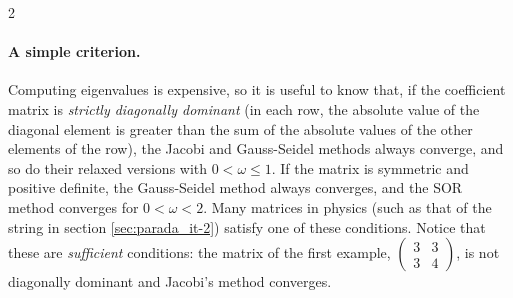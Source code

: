 \begin{paracol}{2}
\paragraph{A simple criterion.} Computing eigenvalues is expensive, so it is useful to know that, if the coefficient matrix is \emph{strictly diagonally dominant} (in each row, the absolute value of the diagonal element is greater than the sum of the absolute values of the other elements of the row), the Jacobi and Gauss-Seidel methods always converge, and so do their relaxed versions with $0<\omega\leq1$. If the matrix is symmetric and positive definite, the Gauss-Seidel method always converges, and the SOR method converges for $0<\omega<2$. Many matrices in physics (such as that of the string in section \ref{sec:parada_it-2}) satisfy one of these conditions. Notice that these are \emph{sufficient} conditions: the matrix of the first example, $\left(\begin{smallmatrix}3&3\\3&4\end{smallmatrix}\right)$, is not diagonally dominant and Jacobi's method converges.
\end{paracol}


